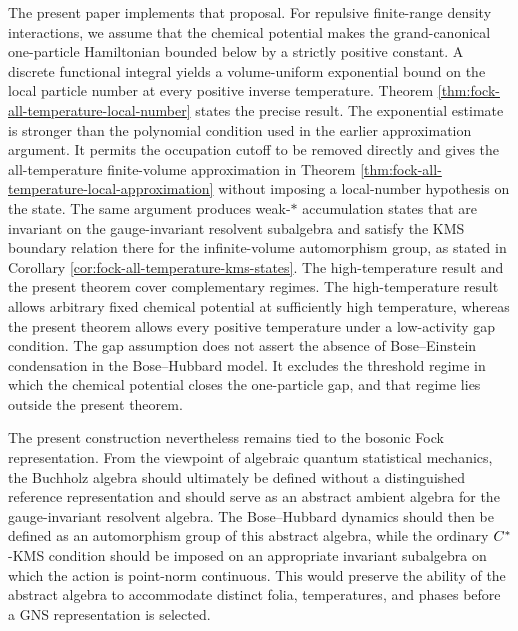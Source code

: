 \documentclass[11pt,a4paper]{article}
\theoremstyle{plain}
\theoremstyle{definition}
\theoremstyle{remark}
\begin{document}
The present paper implements that proposal. For repulsive finite-range density interactions, we assume that the chemical potential makes the grand-canonical one-particle Hamiltonian bounded below by a strictly positive constant. A discrete functional integral yields a volume-uniform exponential bound on the local particle number at every positive inverse temperature. Theorem \ref{thm:fock-all-temperature-local-number} states the precise result. The exponential estimate is stronger than the polynomial condition used in the earlier approximation argument. It permits the occupation cutoff to be removed directly and gives the all-temperature finite-volume approximation in Theorem \ref{thm:fock-all-temperature-local-approximation} without imposing a local-number hypothesis on the state. The same argument produces weak-\(\ast\) accumulation states that are invariant on the gauge-invariant resolvent subalgebra and satisfy the KMS boundary relation there for the infinite-volume automorphism group, as stated in Corollary \ref{cor:fock-all-temperature-kms-states}. The high-temperature result and the present theorem cover complementary regimes. The high-temperature result allows arbitrary fixed chemical potential at sufficiently high temperature, whereas the present theorem allows every positive temperature under a low-activity gap condition. The gap assumption does not assert the absence of Bose--Einstein condensation in the Bose--Hubbard model. It excludes the threshold regime in which the chemical potential closes the one-particle gap, and that regime lies outside the present theorem.

The present construction nevertheless remains tied to the bosonic Fock representation. From the viewpoint of algebraic quantum statistical mechanics, the Buchholz algebra should ultimately be defined without a distinguished reference representation and should serve as an abstract ambient algebra for the gauge-invariant resolvent algebra. The Bose--Hubbard dynamics should then be defined as an automorphism group of this abstract algebra, while the ordinary \(C^{\ast}\)-KMS condition should be imposed on an appropriate invariant subalgebra on which the action is point-norm continuous. This would preserve the ability of the abstract algebra to accommodate distinct folia, temperatures, and phases before a GNS representation is selected.
\end{document}
